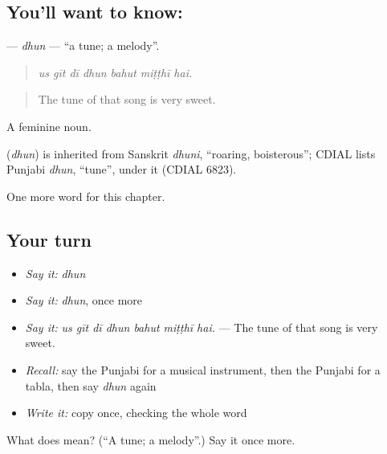 \subsection*{You'll want to know: }
\textbf{} — \emph{dhun} — \textquotedblleft{}a tune; a melody\textquotedblright{}.

\begin{quote}
      
\end{quote}

\begin{quote}
\emph{us gīt dī dhun bahut miṭṭhī hai.}
\end{quote}

\begin{quote}
The tune of that song is very sweet.
\end{quote}

A feminine noun.

\begin{cousinweb}
\textbf{} (\emph{dhun}) is inherited from Sanskrit \emph{dhuni}, \textquotedblleft{}roaring, boisterous\textquotedblright{}; CDIAL lists Punjabi \emph{dhun}, \textquotedblleft{}tune\textquotedblright{}, under it (CDIAL 6823).
\end{cousinweb}

\begin{grammarlens}[title={What you've built}]
One more word for this chapter.
\end{grammarlens}

\subsection*{Your turn}
\begin{itemize}
\raggedright
  \item \emph{Say it:} \emph{dhun}
  \item \emph{Say it:} \emph{dhun}, once more
  \item \emph{Say it:} \emph{us gīt dī dhun bahut miṭṭhī hai.} — The tune of that song is very sweet.
  \item \emph{Recall:} say the Punjabi for a musical instrument, then the Punjabi for a tabla, then say \emph{dhun} again
  \item \emph{Write it:} copy \textbf{} once, checking the whole word
\end{itemize}

\begin{tcolorbox}[breakable,colback=teal!4,colframe=teal!35!black,title={Before you move on}]
What does  mean? (\textquotedblleft{}A tune; a melody\textquotedblright{}.) Say it once more.
\end{tcolorbox}
